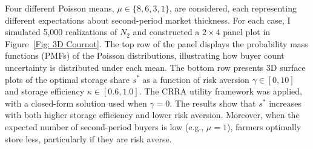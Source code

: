 Four different Poisson means, $\mu \in \{8, 6, 3, 1\}$, are considered, each representing different expectations about second-period market thickness. For each case, I simulated 5,000 realizations of $N_2$ and constructed a $2\times4$ panel plot in Figure~\ref{Fig: 3D Cournot}. The top row of the panel displays the probability mass functions (PMFs) of the Poisson distributions, illustrating how buyer count uncertainty is distributed under each mean. The bottom row presents 3D surface plots of the optimal storage share $s^*$ as a function of risk aversion $\gamma \in [0,10]$ and storage efficiency $\kappa \in [0.6, 1.0]$. The CRRA utility framework was applied, with a closed-form solution used when $\gamma = 0$. The results show that $s^*$ increases with both higher storage efficiency and lower risk aversion. Moreover, when the expected number of second-period buyers is low (e.g., $\mu = 1$), farmers optimally store less, particularly if they are risk averse.

